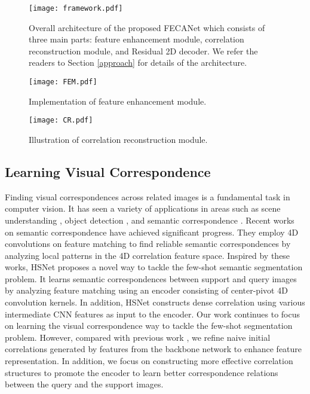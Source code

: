 \documentclass[journal]{IEEEtran}
\begin{document}
\begin{figure*}
\centering
\texttt{[image:  framework.pdf]}
\caption{Overall architecture of the proposed FECANet which consists of three main parts: feature enhancement module, correlation reconstruction module, and Residual 2D decoder. We refer the readers to Section \ref{approach} for details of the architecture.}
\label{fig:figue1}
\end{figure*}
\begin{figure*}
	\begin{minipage}{0.48\textwidth} 
		\centering
		\texttt{[image:  FEM.pdf]}
		\caption{Implementation of feature enhancement module.} 
		\label{fig:figue2}
	\end{minipage}
	\hspace{0.2cm}
	\begin{minipage}{0.48\textwidth} 
		\centering
		\texttt{[image:  CR.pdf]}
		\caption{Illustration of correlation reconstruction module.}
		\label{fig:figue3}
	\end{minipage}
\end{figure*}

\subsection{Learning Visual Correspondence}
Finding visual correspondences \cite{balntas2017hpatches, ham2017proposal} across related images is a fundamental task in computer vision. It has seen a variety of applications in areas such as scene understanding \cite{liu2010sift}, object detection \cite{duchenne2011graph}, and semantic correspondence \cite{choy2016universal, kim2018recurrent,  kim2017fcss, rocco2017convolutional}. Recent works on semantic correspondence \cite{li2020correspondence, rocco2018neighbourhood} have achieved significant progress. They employ 4D convolutions on feature matching to find reliable semantic correspondences by analyzing local patterns in the 4D correlation feature space. Inspired by these works, HSNet \cite{min2021hypercorrelation} proposes a novel way to tackle the few-shot semantic segmentation problem. It learns semantic correspondences between support and query images by analyzing feature matching using an encoder consisting of center-pivot 4D convolution kernels. In addition, HSNet \cite{min2021hypercorrelation} constructs dense correlation using various intermediate CNN features as input to the encoder. Our work continues to focus on learning the visual correspondence way to tackle the few-shot segmentation problem. However, compared with previous work \cite{wang2018non, zhang2019canet, min2021hypercorrelation}, we refine naive initial correlations generated by features from the backbone network to enhance feature representation. In addition, we focus on constructing more effective correlation structures to promote the encoder to learn better correspondence relations between the query and the support images. 
\end{document}
